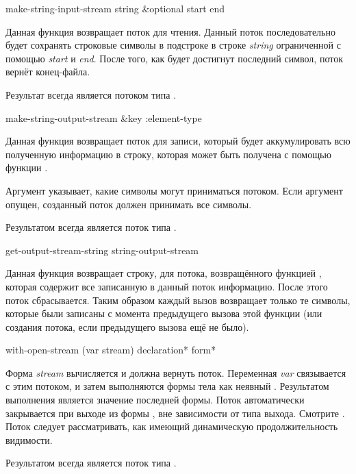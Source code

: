 \begin{defun}[Функция]
make-string-input-stream string &optional start end

Данная функция возвращает поток для чтения.
Данный поток последовательно будет сохранять строковые символы в подстроке в
строке \emph{string} ограниченной с помощью \emph{start} и \emph{end}. После
того, как будет достигнут последний символ, поток вернёт конец-файла.

Результат  всегда является потоком типа
.
\end{defun}

\begin{defun}[Функция]
make-string-output-stream &key :element-type

Данная функция возвращает поток для записи, который будет аккумулировать всю
полученную информацию в строку, которая может быть получена с помощью функции
.

Аргумент  указывает, какие символы могут приниматься
потоком. Если аргумент  опущен, созданный поток должен
принимать все символы.

Результатом  всегда является поток типа
.
\end{defun}

\begin{defun}[Функция]
get-output-stream-string string-output-stream

Данная функция возвращает строку, для потока, возвращённого функцией
, которая содержит все записанную в данный поток
информацию. После этого поток сбрасывается. Таким образом каждый вызов
 возвращает только те символы, которые были
записаны с момента предыдущего вызова этой функции (или создания потока, если
предыдущего вызова ещё не было).
\end{defun}

\begin{defmac}
with-open-stream (var stream) {declaration}* {form}*

Форма \emph{stream} вычисляется и должна вернуть поток.
Переменная \emph{var} связывается с этим потоком, и затем выполняются формы тела
как неявный . Результатом выполнения  является
значение последней формы.
Поток автоматически закрывается при выходе из формы , вне
зависимости от типа выхода. Смотрите .
Поток следует рассматривать, как имеющий динамическую продолжительность
видимости.

Результатом  всегда является поток типа
.
\end{defmac}

